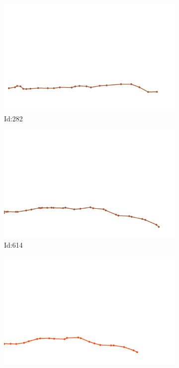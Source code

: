 \documentclass[12pt,twoside]{report}
\begin{document}
\begin{figure}
\centering
\begin{subfigure}[b]{0.20\textwidth}
\centering
\includegraphics[width=\textwidth]{../../trajectories/282.png}
\caption{Id:282}
\end{subfigure}
\begin{subfigure}[b]{0.20\textwidth}
\centering
\includegraphics[width=\textwidth]{../../trajectories/614.png}
\caption{Id:614}
\end{subfigure}
\begin{subfigure}[b]{0.20\textwidth}
\centering
\includegraphics[width=\textwidth]{../../trajectories/667.png}

\end{subfigure}
\end{figure}
\end{document}
